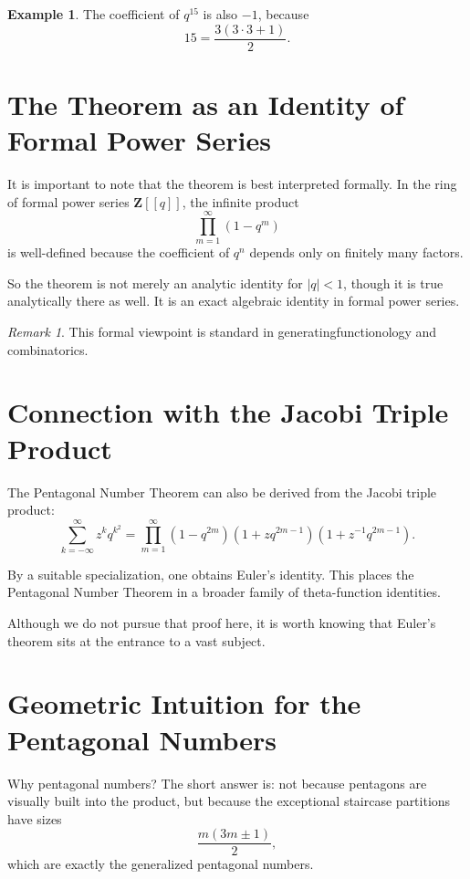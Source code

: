 \documentclass[11pt]{article}
\theoremstyle{definition}
\newtheorem{example}[theorem]{Example}
\theoremstyle{remark}
\newtheorem{remark}[theorem]{Remark}
\newcommand{\ZZ}{\mathbf{Z}}
\begin{document}
	\begin{example}
		The coefficient of \(q^{15}\) is also \(-1\), because
		\[
		15=\frac{3(3\cdot 3+1)}{2}.
		\]
	\end{example}
	
	\section{The Theorem as an Identity of Formal Power Series}
	
	It is important to note that the theorem is best interpreted formally. In the ring of formal power series \(\ZZ[[q]]\), the infinite product
	\[
	\prod_{m=1}^{\infty}(1-q^m)
	\]
	is well-defined because the coefficient of \(q^n\) depends only on finitely many factors.
	
	So the theorem is not merely an analytic identity for \(|q|<1\), though it is true analytically there as well. It is an exact algebraic identity in formal power series.
	
	\begin{remark}
		This formal viewpoint is standard in generatingfunctionology and combinatorics.
	\end{remark}
	
	\section{Connection with the Jacobi Triple Product}
	
	The Pentagonal Number Theorem can also be derived from the Jacobi triple product:
	\[
	\sum_{k=-\infty}^{\infty} z^k q^{k^2}
	=
	\prod_{m=1}^{\infty}(1-q^{2m})(1+zq^{2m-1})(1+z^{-1}q^{2m-1}).
	\]
	
	By a suitable specialization, one obtains Euler's identity. This places the Pentagonal Number Theorem in a broader family of theta-function identities.
	
	Although we do not pursue that proof here, it is worth knowing that Euler's theorem sits at the entrance to a vast subject.
	
	\section{Geometric Intuition for the Pentagonal Numbers}
	
	Why pentagonal numbers? The short answer is: not because pentagons are visually built into the product, but because the exceptional staircase partitions have sizes
	\[
	\frac{m(3m\pm 1)}{2},
	\]
	which are exactly the generalized pentagonal numbers.
	
\end{document}
